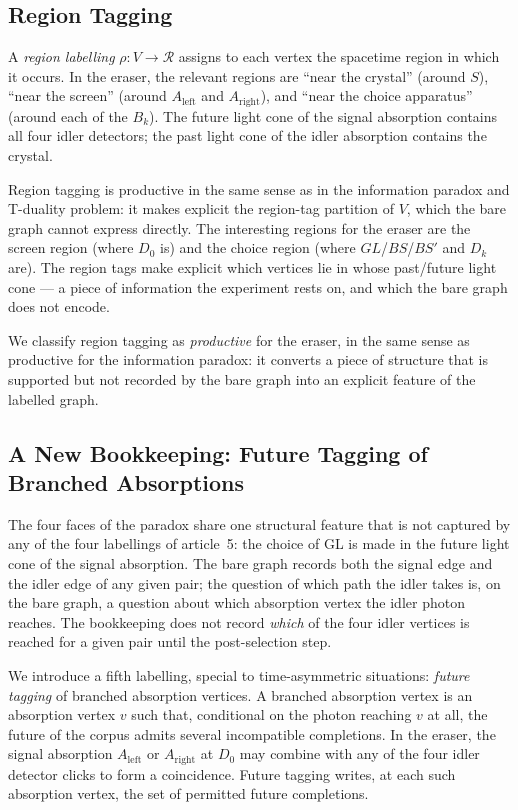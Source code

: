 \documentclass[11pt]{article}
\begin{document}
\subsection{Region Tagging}

A \emph{region labelling} $\rho : V \to \mathcal{R}$ assigns to each vertex the spacetime region in which it occurs. In the eraser, the relevant regions are ``near the crystal'' (around $S$), ``near the screen'' (around $A_{\text{left}}$ and $A_{\text{right}}$), and ``near the choice apparatus'' (around each of the $B_k$). The future light cone of the signal absorption contains all four idler detectors; the past light cone of the idler absorption contains the crystal.

Region tagging is productive in the same sense as in the information paradox and T-duality problem: it makes explicit the region-tag partition of $V$, which the bare graph cannot express directly. The interesting regions for the eraser are the screen region (where $D_0$ is) and the choice region (where $GL$/$BS$/$BS'$ and $D_k$ are). The region tags make explicit which vertices lie in whose past/future light cone --- a piece of information the experiment rests on, and which the bare graph does not encode.

We classify region tagging as \emph{productive} for the eraser, in the same sense as productive for the information paradox: it converts a piece of structure that is supported but not recorded by the bare graph into an explicit feature of the labelled graph.

\subsection{A New Bookkeeping: Future Tagging of Branched Absorptions}

The four faces of the paradox share one structural feature that is not captured by any of the four labellings of article~5: the choice of GL is made in the future light cone of the signal absorption. The bare graph records both the signal edge and the idler edge of any given pair; the question of which path the idler takes is, on the bare graph, a question about which absorption vertex the idler photon reaches. The bookkeeping does not record \emph{which} of the four idler vertices is reached for a given pair until the post-selection step.

We introduce a fifth labelling, special to time-asymmetric situations: \emph{future tagging} of branched absorption vertices. A branched absorption vertex is an absorption vertex $v$ such that, conditional on the photon reaching $v$ at all, the future of the corpus admits several incompatible completions. In the eraser, the signal absorption $A_{\text{left}}$ or $A_{\text{right}}$ at $D_0$ may combine with any of the four idler detector clicks to form a coincidence. Future tagging writes, at each such absorption vertex, the set of permitted future completions.
\end{document}
